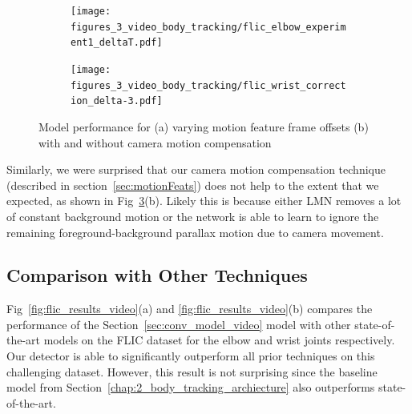 \begin{figure}[ht]
        \centering
        \begin{subfigure}{0.45\textwidth}
                \centering
                \texttt{[image: figures\_3\_video\_body\_tracking/flic\_elbow\_experiment1\_deltaT.pdf]}
                \caption{\footnotesize }
                \label{fig:analysis_deltat}
        \end{subfigure}
        \begin{subfigure}{0.45\textwidth}
                \centering
                \texttt{[image: figures\_3\_video\_body\_tracking/flic\_wrist\_correction\_delta-3.pdf]}
                \caption{\footnotesize }
                \label{fig:analysis_camera}
        \end{subfigure}
        \caption{Model performance for (a) varying motion feature frame offsets (b) with and without camera motion compensation}
        \label{fig:analysis}
\end{figure}

Similarly, we were surprised that our camera motion compensation technique (described in section~\ref{sec:motionFeats}) does not help to the extent that we expected, as shown in Fig~\ref{fig:analysis}(b).  Likely this is because either LMN  removes a lot of constant background motion or the network is able to learn to ignore the remaining foreground-background parallax motion due to camera movement. 

\subsection{Comparison with Other Techniques}
\label{sec:resultsComparison}

Fig~\ref{fig:flic_results_video}(a) and \ref{fig:flic_results_video}(b) compares the performance of the Section~\ref{sec:conv_model_video} model with other state-of-the-art models on the FLIC dataset for the elbow and wrist joints respectively.  Our detector is able to significantly outperform all prior techniques on this challenging dataset. However, this result is not surprising since the baseline model from Section~\ref{chap:2_body_tracking_archiecture} also outperforms state-of-the-art.

